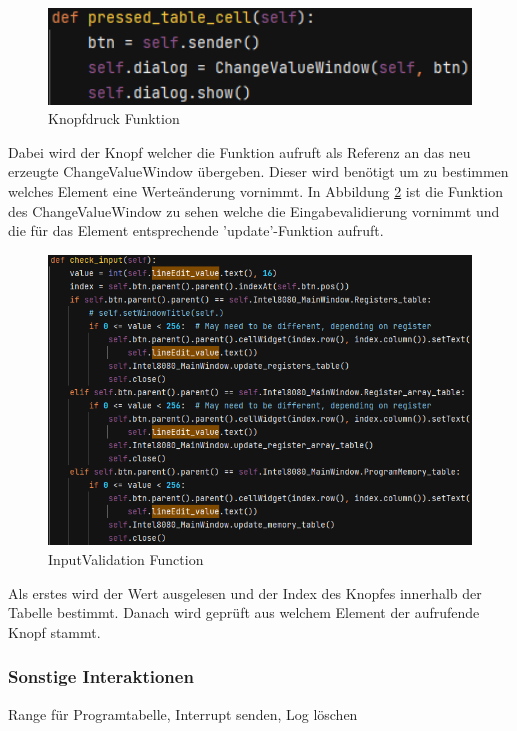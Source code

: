 \documentclass[12pt]{article}
\newcommand{\imgSpaceBefore}{\vspace{10pt}}
\begin{document}
\begin{figure}[H]
\centering
\includegraphics[width=12cm]{bilder/PTC}
\caption{Knopfdruck Funktion}
\label{fig:PTC}
\end{figure}

\noindent
Dabei wird der Knopf welcher die Funktion aufruft als Referenz an das neu erzeugte ChangeValueWindow übergeben. Dieser wird benötigt um zu bestimmen welches Element eine Werteänderung vornimmt. In Abbildung \ref{fig:CheckInput} ist die Funktion des ChangeValueWindow zu sehen welche die Eingabevalidierung vornimmt und die für das Element entsprechende 'update'-Funktion aufruft.\imgSpaceBefore

\begin{figure}[H]
\centering
\includegraphics[width=12cm]{bilder/CheckInput}
\caption{InputValidation Function}
\label{fig:CheckInput}
\end{figure}

\noindent
Als erstes wird der Wert ausgelesen und der Index des Knopfes innerhalb der Tabelle bestimmt. Danach wird geprüft aus welchem Element der aufrufende Knopf stammt.

\subsubsection{Sonstige Interaktionen}
Range für Programtabelle, Interrupt senden, Log löschen

\newpage
\end{document}
